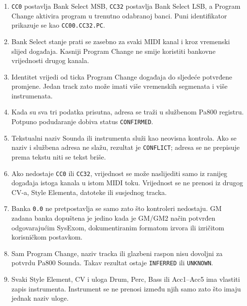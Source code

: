 \documentclass[11pt]{article}
\begin{document}
\begin{enumerate}[label=I\arabic*.]
    \item \texttt{CC0} postavlja Bank Select MSB, \texttt{CC32} postavlja Bank
    Select LSB, a Program Change aktivira program u trenutno odabranoj banci.
    Puni identifikator prikazuje se kao \texttt{CC00.CC32.PC}.

    \item Bank Select stanje prati se zasebno za svaki MIDI kanal i kroz
    vremenski slijed događaja. Kasniji Program Change ne smije koristiti
    bankovne vrijednosti drugog kanala.

    \item Identitet vrijedi od ticka Program Change događaja do sljedeće
    potvrđene promjene. Jedan track zato može imati više vremenskih segmenata i
    više instrumenata.

    \item Kada su sva tri podatka prisutna, adresa se traži u službenom Pa800
    registru. Potpuno podudaranje dobiva status \texttt{CONFIRMED}.

    \item Tekstualni naziv Sounda ili instrumenta služi kao neovisna kontrola.
    Ako se naziv i službena adresa ne slažu, rezultat je \texttt{CONFLICT};
    adresa se ne prepisuje prema tekstu niti se tekst briše.

    \item Ako nedostaje \texttt{CC0} ili \texttt{CC32}, vrijednost se može
    naslijediti samo iz ranijeg događaja istoga kanala u istom MIDI toku.
    Vrijednost se ne prenosi iz drugog CV-a, Style Elementa, datoteke ili
    susjednog tracka.

    \item Banka \texttt{0.0} ne pretpostavlja se samo zato što kontroleri
    nedostaju. GM zadana banka dopuštena je jedino kada je GM/GM2 način
    potvrđen odgovarajućim SysExom, dokumentiranim formatom izvora ili izričitom
    korisničkom postavkom.

    \item Sam Program Change, naziv tracka ili glazbeni raspon nisu dovoljni za
    potvrdu Pa800 Sounda. Takav rezultat ostaje \texttt{INFERRED} ili
    \texttt{UNKNOWN}.

    \item Svaki Style Element, CV i uloga Drum, Perc, Bass ili Acc1--Acc5 ima
    vlastiti zapis instrumenta. Instrument se ne prenosi između njih samo zato
    što imaju jednak naziv uloge.


\end{enumerate}
\end{document}
